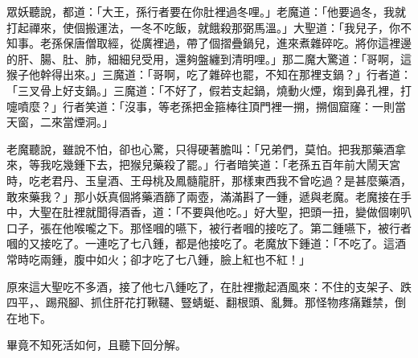 眾妖聽說，都道：「大王，孫行者要在你肚裡過冬哩。」老魔道：「他要過冬，我就打起禪來，使個搬運法，一冬不吃飯，就餓殺那弼馬溫。」大聖道：「我兒子，你不知事。老孫保唐僧取經，從廣裡過，帶了個摺疊鍋兒，進來煮雜碎吃。將你這裡邊的肝、腸、肚、肺，細細兒受用，還夠盤纏到清明哩。」那二魔大驚道：「哥啊，這猴子他幹得出來。」三魔道：「哥啊，吃了雜碎也罷，不知在那裡支鍋？」行者道：「三叉骨上好支鍋。」三魔道：「不好了，假若支起鍋，燒動火煙，煼到鼻孔裡，打嚏噴麼？」行者笑道：「沒事，等老孫把金箍棒往頂門裡一搠，搠個窟窿：一則當天窗，二來當煙洞。」

老魔聽說，雖說不怕，卻也心驚，只得硬著膽叫：「兄弟們，莫怕。把我那藥酒拿來，等我吃幾鍾下去，把猴兒藥殺了罷。」行者暗笑道：「老孫五百年前大鬧天宮時，吃老君丹、玉皇酒、王母桃及鳳髓龍肝，那樣東西我不曾吃過？是甚麼藥酒，敢來藥我？」那小妖真個將藥酒篩了兩壺，滿滿斟了一鍾，遞與老魔。老魔接在手中，大聖在肚裡就聞得酒香，道：「不要與他吃。」好大聖，把頭一扭，變做個喇叭口子，張在他喉嚨之下。那怪嘓的嚥下，被行者嘓的接吃了。第二鍾嚥下，被行者嘓的又接吃了。一連吃了七八鍾，都是他接吃了。老魔放下鍾道：「不吃了。這酒常時吃兩鍾，腹中如火；卻才吃了七八鍾，臉上紅也不紅！」

原來這大聖吃不多酒，接了他七八鍾吃了，在肚裡撒起酒風來：不住的支架子、跌四平，、踢飛腳、抓住肝花打鞦韆、豎蜻蜓、翻根頭、亂舞。那怪物疼痛難禁，倒在地下。

畢竟不知死活如何，且聽下回分解。
